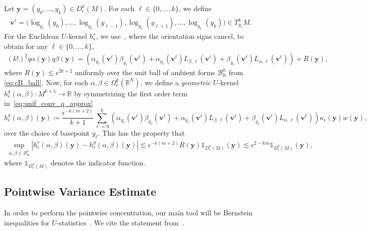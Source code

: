 \documentclass[11pt,reqno]{amsproc}
\numberwithin{equation}{section}
\newcommand{\R}{\mathbb{R}}
\newcommand{\one}{\mathbb{1}}
\newcommand{\by}{\mathbf{y}}
\newcommand{\bv}{\mathbf{v}}
\newcommand{\cB}{\mathcal{B}}
\newcommand{\ls}{\lesssim}
\theoremstyle{definition}
\theoremstyle{plain}
\begin{document}
    Let $\by = (y_0, \ldots, y_k) \in D^k_\epsilon(M)$. For each $\ell \in \{0,\ldots,k\}$, we define
    \begin{align}
        \bv^\ell = \Big( \log_{y_\ell}(y_0), \ldots, \log_{y_{\ell}}(y_{\ell-1}), \log_{y_{\ell}}(y_{\ell+1}), \ldots, \log_{y_\ell}(y_k) \Big) \in T^k_{y_\ell} M.
    \end{align}
    For the Euclidean $U$-kernel $h_\epsilon^e$, we use~, where the orientation signs cancel, to obtain for any $\ell \in \{0,\ldots,k\}$,
    \begin{align} \label{eq:unif_conv_q_approx}
        (k!)^2 q\alpha(\by)q\beta(\by) = \left(\alpha_{y_\ell}(\bv^\ell)\beta_{y_\ell}(\bv^\ell) + \alpha_{y_\ell}(\bv^\ell) L_{\beta,\ell}(\bv^\ell) + \beta_{y_\ell}(\bv^\ell) L_{\alpha,\ell}(\bv^\ell) \right) + R(\by),
    \end{align}
    where $R(\by) \ls \epsilon^{2k+2}$ uniformly over the unit ball of ambient forms $\cB_\R^k$ from \eqref{eq:cB_ball}. Now, for each $\alpha, \beta \in \Omega^k_c(\R^N)$, we define a \emph{geometric} $U$-kernel $h^g_\epsilon(\alpha,\beta) : M^{k+1} \to \R$ by symmetrizing the first order term in~\eqref{eq:unif_conv_q_approx}
    \begin{equation} \label{eq:geom-U-kernel}
        h^g_\epsilon(\alpha, \beta)(\by) \coloneqq \frac{\epsilon^{-k(m+2)}}{k+1}\sum_{\ell=0}^k \left(\alpha_{y_\ell}(\bv^\ell)\beta_{y_\ell}(\bv^\ell) + \alpha_{y_\ell}(\bv^\ell) L_{\beta,\ell}(\bv^\ell) + \beta_{y_\ell}(\bv^\ell) L_{\alpha,\ell}(\bv^\ell) \right) \kappa_\epsilon(\by) w(\by),
    \end{equation} over the choice of basepoint $y_\ell$. This has the property that
    \begin{align} \label{eq:euclidean_geometric_u_kernel_error}
        \sup_{\alpha, \beta \in\cB_\R^k} |h^e_\epsilon(\alpha, \beta)(\by) - h^g_\epsilon(\alpha, \beta)(\by)| \ls  \epsilon^{-k(m+2)} R(\by) \one_{D^k_\epsilon(M)}(\by) \ls \epsilon^{2-km} \one_{D^k_\epsilon(M)}(\by),
    \end{align}
    where $\one_{D^k_\epsilon(M)}$ denotes the indicator function. 


    \subsection{Pointwise Variance Estimate} \label{ssec:uc_pointwise_estimate}

    In order to perform the pointwise concentration, our main tool will be Bernstein inequalities for $U$-statistics~\cite{hoeffding_probability_1963,arcones_bernstein-type_1995}. We cite the statement from~\cite{peel_empirical_2010}.
\end{document}
